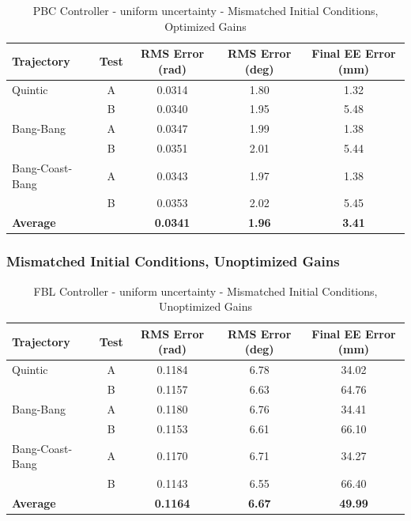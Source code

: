 \documentclass[11pt,a4paper]{article}
\begin{document}
\begin{table}[H]
\centering
\caption{PBC Controller - uniform uncertainty - Mismatched Initial Conditions, Optimized Gains}
\begin{tabular}{lcccc}
\toprule
Trajectory & Test & RMS Error (rad) & RMS Error (deg) & Final EE Error (mm) \\
\midrule
Quintic & A & 0.0314 & 1.80 & 1.32 \\
 & B & 0.0340 & 1.95 & 5.48 \\
\midrule
Bang-Bang & A & 0.0347 & 1.99 & 1.38 \\
 & B & 0.0351 & 2.01 & 5.44 \\
\midrule
Bang-Coast-Bang & A & 0.0343 & 1.97 & 1.38 \\
 & B & 0.0353 & 2.02 & 5.45 \\
\midrule
\textbf{Average} & & \textbf{0.0341} & \textbf{1.96} & \textbf{3.41} \\
\bottomrule
\end{tabular}
\end{table}

\subsubsection{Mismatched Initial Conditions, Unoptimized Gains}

\begin{table}[H]
\centering
\caption{FBL Controller - uniform uncertainty - Mismatched Initial Conditions, Unoptimized Gains}
\begin{tabular}{lcccc}
\toprule
Trajectory & Test & RMS Error (rad) & RMS Error (deg) & Final EE Error (mm) \\
\midrule
Quintic & A & 0.1184 & 6.78 & 34.02 \\
 & B & 0.1157 & 6.63 & 64.76 \\
\midrule
Bang-Bang & A & 0.1180 & 6.76 & 34.41 \\
 & B & 0.1153 & 6.61 & 66.10 \\
\midrule
Bang-Coast-Bang & A & 0.1170 & 6.71 & 34.27 \\
 & B & 0.1143 & 6.55 & 66.40 \\
\midrule
\textbf{Average} & & \textbf{0.1164} & \textbf{6.67} & \textbf{49.99} \\
\bottomrule
\end{tabular}
\end{table}
\end{document}
